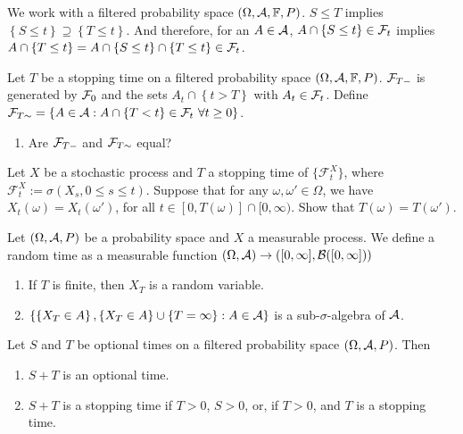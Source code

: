 \solution
We work with a filtered probability space $(\Omega,\mathcal A, \mathbb F, P)$.
$S\leq T$ implies $\left\{ S\leq t \right\} \supseteq \left\{ T\leq t
\right\}$.  And therefore, for an $A\in \mathcal A$, $A \cap \left\{ S\leq t
\right\}\in\mathcal F_{t}$ implies $A \cap \left\{ T\leq t \right\} = A\cap \left\{
S\leq t \right\}\cap \left\{ T\leq t \right\}\in\mathcal F_{t}$.

Let $T$ be a stopping time on a filtered probability space $(\Omega,\mathcal A, \mathbb F,
P)$.  $\mathcal F_{T-}$ is generated by $\mathcal F_0$ and the sets $A_{t} \cap \left\{ {t>T}
\right\}$ with $A_t \in \mathcal F_t$.  Define $\mathcal F_{T\sim} = \left\{ A \in \mathcal A : A
\cap \left\{ T <t \right\} \in\mathcal F_{t} \ \forall t\geq 0 \right\}$. 
\begin{enumerate}
    \item Are $\mathcal F_{T-}$ and $\mathcal F_{T\sim}$ equal?
\end{enumerate}


Let $ X $ be a stochastic process and $ T $ a stopping time of $\{ \mathcal{F}_t^X \}$, where 
$\mathcal{F}_t^X := \sigma (X_s, 0 \leq s \leq t)$.
Suppose that for any $\omega, \omega' \in \Omega $, we have $X_t(\omega) = X_t(\omega')$,
for all $t \in [0, T(\omega)] \cap [0, \infty)$.
Show that $T(\omega) = T(\omega')$.


Let $(\Omega, \mathcal A, P)$ be a probability space and $X$ a measurable process.  We
define a random time as a measurable function $(\Omega, \mathcal A)\to ([0,\infty], \mathcal B([0,\infty]))$
\begin{enumerate}
    \item If $T$ is finite, then $X_T$ is a random variable. 
    \item $\left\{\left\{ X_T \in A \right\}, \left\{ X_T \in A \right\}\cup \left\{ T=\infty \right\} : A\in\mathcal A \right\}$
        is a sub-$\sigma$-algebra of $\mathcal A$. 
\end{enumerate}

 Let $S$ and $T$ be optional times on a filtered probability
space $\left( \Omega, \mathcal A, P \right)$. Then
\begin{enumerate}
    \item $S+T$ is an optional time.
    \item $S+T$ is a stopping time if $T>0$, $S>0$, or, if $T>0$, and $T$ is a
        stopping time. 
\end{enumerate} %

